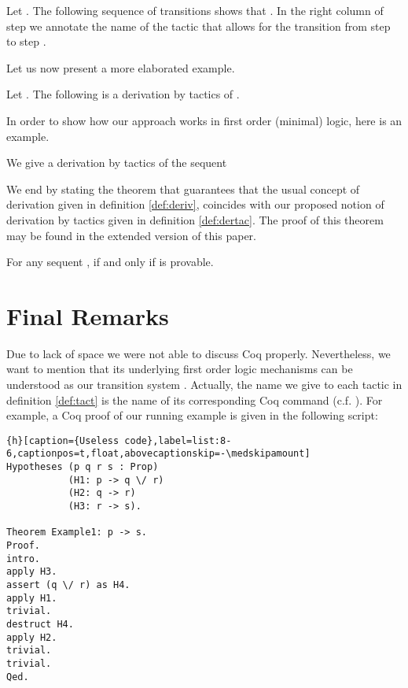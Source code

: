 \documentclass[a4paper,UKenglish]{lipics}
\begin{document}
\begin{example}
Let 
. The following sequence of transitions
shows that . In the right column of step  we annotate the name of the tactic that allows for the transition from step  to step . 


\end{example}


Let us now present a more elaborated example.

\begin{example}
Let 
. The following 
is a derivation by tactics of .


\end{example}

In order to show how our approach works in first order (minimal) logic, here is an example.

\begin{example}
We give a derivation by tactics of the sequent 


 
\end{example}


We end by stating the theorem that guarantees that the usual concept of derivation given in definition \ref{def:deriv}, coincides with our proposed notion of derivation by tactics given in definition \ref{def:dertac}. The proof of this theorem may be found in the extended version of this paper.

\begin{theorem}\label{thm:equiv}
  For any sequent ,  if and only if  is provable.
\end{theorem}

\section{Final Remarks}
Due to lack of space we were not able to discuss {\sc Coq} properly. Nevertheless, we want to mention that its underlying first order logic mechanisms can be understood as our transition system . Actually, the name we give to each tactic in definition \ref{def:tact} is the name of its corresponding {\sc Coq} command (c.f. \cite{bertot}). For example, a {\sc Coq} proof of our running example is given in the following script: 

\begin{lstlisting}{h}[caption={Useless code},label=list:8-6,captionpos=t,float,abovecaptionskip=-\medskipamount]
Hypotheses (p q r s : Prop)
           (H1: p -> q \/ r) 
           (H2: q -> r)
           (H3: r -> s). 
         
Theorem Example1: p -> s.
Proof.
intro.
apply H3.
assert (q \/ r) as H4.
apply H1.
trivial.
destruct H4.
apply H2.
trivial.
trivial.
Qed.
\end{lstlisting}
\end{document}
